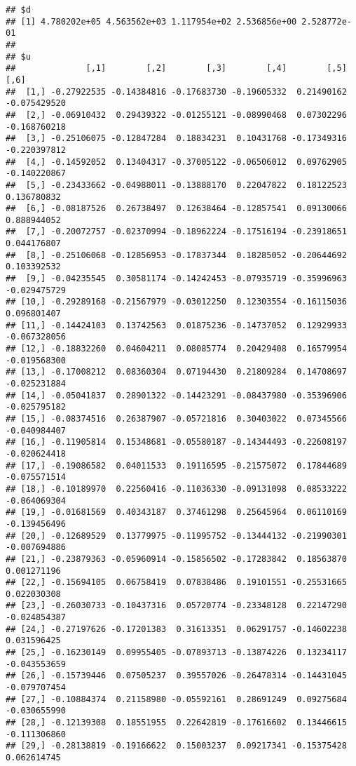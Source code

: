 \documentclass[
]{book}
\begin{document}
\begin{verbatim}
## $d
## [1] 4.780202e+05 4.563562e+03 1.117954e+02 2.536856e+00 2.528772e-01
## 
## $u
##              [,1]        [,2]        [,3]        [,4]        [,5]         [,6]
##  [1,] -0.27922535 -0.14384816 -0.17683730 -0.19605332  0.21490162 -0.075429520
##  [2,] -0.06910432  0.29439322 -0.01255121 -0.08990468  0.07302296 -0.168760218
##  [3,] -0.25106075 -0.12847284  0.18834231  0.10431768 -0.17349316 -0.220397812
##  [4,] -0.14592052  0.13404317 -0.37005122 -0.06506012  0.09762905 -0.140220867
##  [5,] -0.23433662 -0.04988011 -0.13888170  0.22047822  0.18122523  0.136780832
##  [6,] -0.08187526  0.26738497  0.12638464 -0.12857541  0.09130066  0.888944052
##  [7,] -0.20072757 -0.02370994 -0.18962224 -0.17516194 -0.23918651  0.044176807
##  [8,] -0.25106068 -0.12856953 -0.17837344  0.18285052 -0.20644692  0.103392532
##  [9,] -0.04235545  0.30581174 -0.14242453 -0.07935719 -0.35996963 -0.029475729
## [10,] -0.29289168 -0.21567979 -0.03012250  0.12303554 -0.16115036  0.096801407
## [11,] -0.14424103  0.13742563  0.01875236 -0.14737052  0.12929933 -0.067328056
## [12,] -0.18832260  0.04604211  0.08085774  0.20429408  0.16579954 -0.019568300
## [13,] -0.17008212  0.08360304  0.07194430  0.21809284  0.14708697 -0.025231884
## [14,] -0.05041837  0.28901322 -0.14423291 -0.08437980 -0.35396906 -0.025795182
## [15,] -0.08374516  0.26387907 -0.05721816  0.30403022  0.07345566 -0.040984407
## [16,] -0.11905814  0.15348681 -0.05580187 -0.14344493 -0.22608197 -0.020624418
## [17,] -0.19086582  0.04011533  0.19116595 -0.21575072  0.17844689 -0.075571514
## [18,] -0.10189970  0.22560416 -0.11036330 -0.09131098  0.08533222 -0.064069304
## [19,] -0.01681569  0.40343187  0.37461298  0.25645964  0.06110169 -0.139456496
## [20,] -0.12689529  0.13779975 -0.11995752 -0.13444132 -0.21990301 -0.007694886
## [21,] -0.23879363 -0.05960914 -0.15856502 -0.17283842  0.18563870  0.001271196
## [22,] -0.15694105  0.06758419  0.07838486  0.19101551 -0.25531665  0.022030308
## [23,] -0.26030733 -0.10437316  0.05720774 -0.23348128  0.22147290 -0.024854387
## [24,] -0.27197626 -0.17201383  0.31613351  0.06291757 -0.14602238  0.031596425
## [25,] -0.16230149  0.09955405 -0.07893713 -0.13874226  0.13234117 -0.043553659
## [26,] -0.15739446  0.07505237  0.39557026 -0.26478314 -0.14431045 -0.079707454
## [27,] -0.10884374  0.21158980 -0.05592161  0.28691249  0.09275684 -0.030655990
## [28,] -0.12139308  0.18551955  0.22642819 -0.17616602  0.13446615 -0.111306860
## [29,] -0.28138819 -0.19166622  0.15003237  0.09217341 -0.15375428  0.062614745

\end{verbatim}
\end{document}
